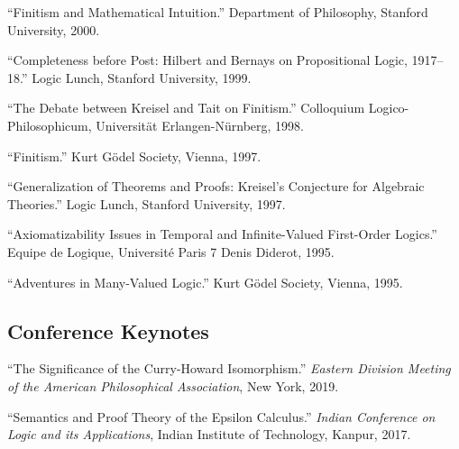 \documentclass[11pt]{article}
\def\printdate#1{\xprintdate#1-}
\def\xprintdate#1-#2-#3-{#1}
\begin{document}
\ind ``Finitism and Mathematical Intuition.'' Department of Philosophy, Stanford University, \printdate{2000-01-27}.






\ind ``Completeness before Post: Hilbert and Bernays on Propositional Logic,
1917--18.'' Logic Lunch, Stanford University, \printdate{1999-02-12}.



\ind ``The Debate between Kreisel and Tait on Finitism.'' Colloquium Logico-Philosophicum, Universität Erlangen-Nürnberg, \printdate{1998-04-29}.



\ind ``Finitism.'' Kurt Gödel Society, Vienna, \printdate{1997-00-00}.


\ind ``Generalization of Theorems and Proofs: Kreisel's Conjecture for
Algebraic Theories.'' Logic Lunch, Stanford University, \printdate{1997-00-00}.




\ind ``Axiomatizability Issues in Temporal and Infinite-Valued First-Order
Logics.'' Equipe de Logique, Université Paris 7 Denis Diderot, \printdate{1995-00-00}.


\ind ``Adventures in Many-Valued Logic.'' Kurt Gödel Society, Vienna, \printdate{1995-00-00}.
























\subsection{Conference Keynotes}

\ind ``The Significance of the Curry-Howard Isomorphism.'' \emph{Eastern Division Meeting of the American Philosophical Association}, New York, \printdate{2019-01-08}.








\ind ``Semantics and Proof Theory of the Epsilon Calculus.'' \emph{Indian Conference on Logic and its Applications}, Indian Institute of Technology, Kanpur, \printdate{2017-01-06}.
\end{document}
